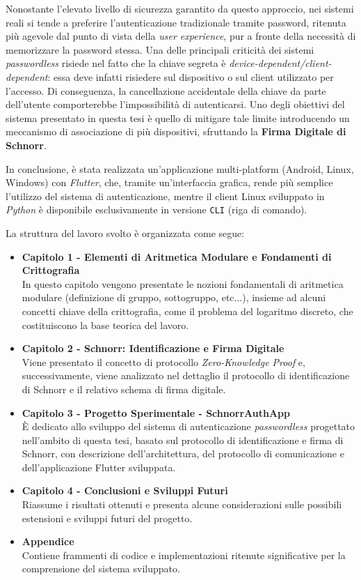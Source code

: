 Nonostante l'elevato livello di sicurezza garantito da questo approccio, nei sistemi reali si tende a preferire l'autenticazione tradizionale tramite password, ritenuta più agevole dal punto di vista della \textit{user experience}, pur a fronte della necessità di memorizzare la password stessa. Una delle principali criticità dei sistemi \textit{passwordless} risiede nel fatto che la chiave segreta è \textit{device-dependent/client-dependent}: essa deve infatti risiedere sul dispositivo o sul client utilizzato per l'accesso. Di conseguenza, la cancellazione accidentale della chiave da parte dell'utente comporterebbe l'impossibilità di autenticarsi. Uno degli obiettivi del sistema presentato in questa tesi è quello di mitigare tale limite introducendo un meccanismo di associazione di più dispositivi, sfruttando la \textbf{Firma Digitale di Schnorr}.

In conclusione, è stata realizzata un'applicazione multi-platform (Android, Linux, Windows) con \textit{Flutter}, che, tramite un'interfaccia grafica, rende più semplice l'utilizzo del sistema di autenticazione, mentre il client Linux sviluppato in \textit{Python} è disponibile esclusivamente in versione \texttt{CLI} (riga di comando).

La struttura del lavoro svolto è organizzata come segue:

\begin{itemize}
    \item \textbf{Capitolo 1 - Elementi di Aritmetica Modulare e Fondamenti di Crittografia} \\
    In questo capitolo vengono presentate le nozioni fondamentali di aritmetica modulare (definizione di gruppo, sottogruppo, etc...), insieme ad alcuni concetti chiave della crittografia, come il problema del logaritmo discreto, che costituiscono la base teorica del lavoro.
    \item \textbf{Capitolo 2 - Schnorr: Identificazione e Firma Digitale} \\
    Viene presentato il concetto di protocollo \textit{Zero-Knowledge Proof} e, successivamente, viene analizzato nel dettaglio il protocollo di identificazione di Schnorr e il relativo schema di firma digitale.
    \item \textbf{Capitolo 3 - Progetto Sperimentale - SchnorrAuthApp} \\
    È dedicato allo sviluppo del sistema di autenticazione \textit{passwordless} progettato nell'ambito di questa tesi, basato sul protocollo di identificazione e firma di Schnorr, con descrizione dell'architettura, del protocollo di comunicazione e dell'applicazione Flutter sviluppata.
    \item \textbf{Capitolo 4 - Conclusioni e Sviluppi Futuri} \\
    Riassume i risultati ottenuti e presenta alcune considerazioni sulle possibili estensioni e sviluppi futuri del progetto.
    \item \textbf{Appendice} \\
    Contiene frammenti di codice e implementazioni ritenute significative per la comprensione del sistema sviluppato.
\end{itemize}